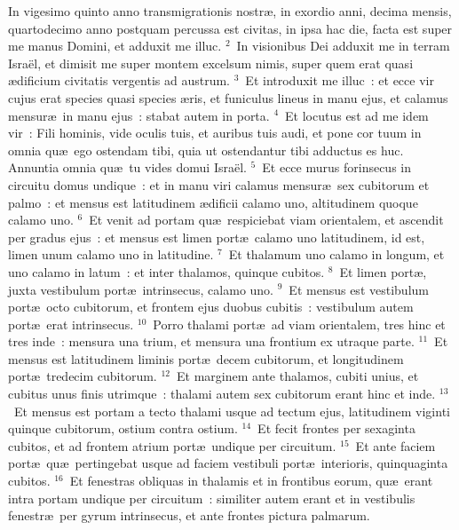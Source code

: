 \lettrine[lines=10,image=true,loversize=0.05,lraise=-0.03]{I}{}n vigesimo quinto anno transmigrationis nostr\ae , in exordio anni, decima mensis, quartodecimo anno postquam percussa est civitas, in ipsa hac die, facta est super me manus Domini, et adduxit me illuc.
${}^{2}$~In visionibus Dei adduxit me in terram Isra\"el, et dimisit me super montem excelsum nimis, super quem erat quasi \ae dificium civitatis vergentis ad austrum.
${}^{3}$~Et introduxit me illuc~: et ecce vir cujus erat species quasi species \ae ris, et funiculus lineus in manu ejus, et calamus mensur\ae\ in manu ejus~: stabat autem in porta.
${}^{4}$~Et locutus est ad me idem vir~: Fili hominis, vide oculis tuis, et auribus tuis audi, et pone cor tuum in omnia qu\ae\ ego ostendam tibi, quia ut ostendantur tibi adductus es huc. Annuntia omnia qu\ae\ tu vides domui Isra\"el.
${}^{5}$~Et ecce murus forinsecus in circuitu domus undique~: et in manu viri calamus mensur\ae\ sex cubitorum et palmo~: et mensus est latitudinem \ae dificii calamo uno, altitudinem quoque calamo uno.
${}^{6}$~Et venit ad portam qu\ae\ respiciebat viam orientalem, et ascendit per gradus ejus~: et mensus est limen port\ae\ calamo uno latitudinem, id est, limen unum calamo uno in latitudine.
${}^{7}$~Et thalamum uno calamo in longum, et uno calamo in latum~: et inter thalamos, quinque cubitos.
${}^{8}$~Et limen port\ae , juxta vestibulum port\ae\ intrinsecus, calamo uno.
${}^{9}$~Et mensus est vestibulum port\ae\ octo cubitorum, et frontem ejus duobus cubitis~: vestibulum autem port\ae\ erat intrinsecus.
${}^{10}$~Porro thalami port\ae\ ad viam orientalem, tres hinc et tres inde~: mensura una trium, et mensura una frontium ex utraque parte.
${}^{11}$~Et mensus est latitudinem liminis port\ae\ decem cubitorum, et longitudinem port\ae\ tredecim cubitorum.
${}^{12}$~Et marginem ante thalamos, cubiti unius, et cubitus unus finis utrimque~: thalami autem sex cubitorum erant hinc et inde.
${}^{13}$~Et mensus est portam a tecto thalami usque ad tectum ejus, latitudinem viginti quinque cubitorum, ostium contra ostium.
${}^{14}$~Et fecit frontes per sexaginta cubitos, et ad frontem atrium port\ae\ undique per circuitum.
${}^{15}$~Et ante faciem port\ae\ qu\ae\ pertingebat usque ad faciem vestibuli port\ae\ interioris, quinquaginta cubitos.
${}^{16}$~Et fenestras obliquas in thalamis et in frontibus eorum, qu\ae\ erant intra portam undique per circuitum~: similiter autem erant et in vestibulis fenestr\ae\ per gyrum intrinsecus, et ante frontes pictura palmarum.



